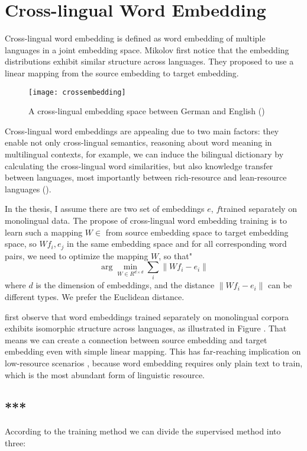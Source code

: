 \section{ Cross-lingual Word Embedding}



	Cross-lingual word embedding is defined as word embedding of multiple languages in a joint embedding space. Mikolov first notice that the embedding distributions exhibit similar structure across languages. They proposed to use a linear mapping from the source embedding to target embedding. \\
	\begin{figure}[t]
		\texttt{[image: crossembedding]}
		\centering
		\caption{A cross-lingual embedding space between German and English (\cite{ruder2017survey})}
	\end{figure}
	
	Cross-lingual word embeddings are appealing due to two main factors: they enable not only cross-lingual semantics, reasoning about word meaning in multilingual contexts, for example, we can induce the bilingual dictionary by calculating the cross-lingual word similarities, but also knowledge transfer between languages, most importantly between rich-resource and lean-resource languages (\cite{adams2017cross}). 

	In the thesis, I assume there are two set of embeddings ${e}$, ${f}$trained separately on monolingual data.  The propose of cross-lingual word embedding training is to learn such a mapping ${W \in }$ from source embedding space to target embedding space, so $Wf_i, e_j$ in the same embedding space and for all corresponding word pairs, we need to optimize the mapping ${W}$, so that" 
	\[ \arg\min_{W \in R^{d \times d}} \sum_{i} \lVert Wf_i - e_i \rVert \]
	where $d$ is the dimension of embeddings, and the distance ${\lVert Wf_i - e_i \rVert}$ can be different types. We prefer the Euclidean distance.  

first observe that word embeddings trained separately on monolingual corpora exhibits isomorphic structure across languages, as illustrated in Figure {}. That means we can create a connection between source embedding and target embedding even with simple linear mapping. This has far-reaching implication on low-resource scenarios {}{}{}, because word embedding requires only plain text to train, which is the most abundant form of linguistic resource.
	

\subsection{***}
According to the training method we can divide the supervised method into three:

